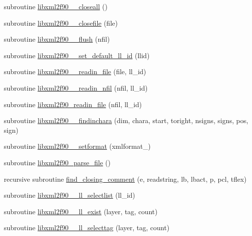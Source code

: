 \begin{DoxyCompactItemize}
\item 
subroutine \hyperlink{libxml2f90_8f90__pp_8f90_aaea8089848b0bc51a87636d0afb1a544}{libxml2f90\+\_\+\+\_\+closeall} ()
\item 
subroutine \hyperlink{libxml2f90_8f90__pp_8f90_a33bae24588e3ae2ed3a7f9756c6845f0}{libxml2f90\+\_\+\+\_\+closefile} (file)
\item 
subroutine \hyperlink{libxml2f90_8f90__pp_8f90_a959df5c9fc5516bfc223af92a5407f8e}{libxml2f90\+\_\+\+\_\+flush} (nfil)
\item 
subroutine \hyperlink{libxml2f90_8f90__pp_8f90_ab64e354c556b4f4e6f258a7573b3fb95}{libxml2f90\+\_\+\+\_\+set\+\_\+default\+\_\+ll\+\_\+id} (llid)
\item 
subroutine \hyperlink{libxml2f90_8f90__pp_8f90_a9bbaec04b4014748bfea3b37b0a13f4a}{libxml2f90\+\_\+\+\_\+readin\+\_\+file} (file, ll\+\_\+id)
\item 
subroutine \hyperlink{libxml2f90_8f90__pp_8f90_affef5dd7f09b41951ccedbf9e0c48bc0}{libxml2f90\+\_\+\+\_\+readin\+\_\+nfil} (nfil, ll\+\_\+id)
\item 
subroutine \hyperlink{libxml2f90_8f90__pp_8f90_ae414619cb8c245cec37ab69b1acd4482}{libxml2f90\+\_\+readin\+\_\+file} (nfil, ll\+\_\+id)
\item 
subroutine \hyperlink{libxml2f90_8f90__pp_8f90_a32693bbc0bcd62439a95f4e0a2d4da6d}{libxml2f90\+\_\+\+\_\+findinchara} (dim, chara, start, toright, nsigns, signs, pos, sign)
\item 
subroutine \hyperlink{libxml2f90_8f90__pp_8f90_a2b331dda347708a2db3459b365b848dc}{libxml2f90\+\_\+\+\_\+setformat} (xmlformat\+\_\+)
\item 
subroutine \hyperlink{libxml2f90_8f90__pp_8f90_a41bf2706485a325b4b1515c83ac50a67}{libxml2f90\+\_\+parse\+\_\+file} ()
\item 
recursive subroutine \hyperlink{libxml2f90_8f90__pp_8f90_a2db841b17a0ef4d76e4b31f4ff479f4c}{find\+\_\+closing\+\_\+comment} (e, readstring, lb, lbact, p, pcl, tflex)
\item 
subroutine \hyperlink{libxml2f90_8f90__pp_8f90_aa648c34edeb1a504525200e1aed59f18}{libxml2f90\+\_\+\+\_\+ll\+\_\+selectlist} (ll\+\_\+id)
\item 
subroutine \hyperlink{libxml2f90_8f90__pp_8f90_a3693c7841e7cf085873b2193e4eb51cf}{libxml2f90\+\_\+\+\_\+ll\+\_\+exist} (layer, tag, count)
\item 
subroutine \hyperlink{libxml2f90_8f90__pp_8f90_a82a4ef1569ea46506f400cf73fce7369}{libxml2f90\+\_\+\+\_\+ll\+\_\+selecttag} (layer, tag, count)
\item 

\end{DoxyCompactItemize}
